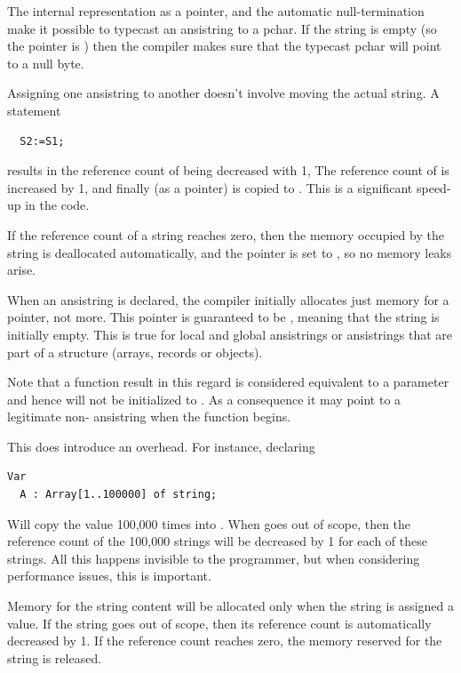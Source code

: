 The internal representation as a pointer, and the automatic null-termination
make it possible to typecast an ansistring to a pchar. If the string is empty
(so the pointer is ) then the compiler makes sure that the typecast
pchar will point to a null byte.

Assigning one ansistring to another doesn't involve moving the actual
string. A statement
\begin{verbatim}
  S2:=S1;
\end{verbatim}
results in the reference count of  being decreased with 1,
The reference count of  is increased by 1, and finally 
(as a pointer) is copied to . This is a significant speed-up in
the code.

If the reference count of a string reaches zero, then the memory occupied
by the string is deallocated automatically, and the pointer is set to
, so no memory leaks arise.

When an ansistring is declared, the \fpc compiler initially
allocates just memory for a pointer, not more. This pointer is guaranteed
to be , meaning that the string is initially empty. This is
true for local and global ansistrings or ansistrings that are part of a
structure (arrays, records or objects).

\begin{remark}
Note that a function result in this regard is considered equivalent to a 
parameter and hence will not be initialized to . As a consequence
it may point to a legitimate non- ansistring when the function
begins.
\end{remark}

This  does introduce an overhead. For instance, declaring
\begin{verbatim}
Var
  A : Array[1..100000] of string;
\end{verbatim}
Will copy the value  100,000 times into .
When  goes out of scope, then the reference
count of the 100,000 strings will be decreased by 1 for each
of these strings. All this happens invisible to the programmer,
but when considering performance issues, this is important.

Memory for the string content will be allocated only when the string is
assigned a value. If the string goes out of scope, then its reference
count is automatically  decreased by 1. If the reference count reaches
zero, the memory reserved for the string is released.

